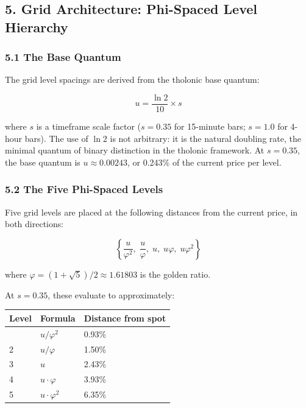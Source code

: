 \documentclass[
  11pt,
  letterpaper,
]{article}
\begin{document}
\subsection{5. Grid Architecture: Phi-Spaced Level
Hierarchy}\label{grid-architecture-phi-spaced-level-hierarchy}

\subsubsection{5.1 The Base Quantum}\label{the-base-quantum}

The grid level spacings are derived from the tholonic base quantum:

\[u = \frac{\ln 2}{10} \times s\]

where \(s\) is a timeframe scale factor (\(s = 0.35\) for 15-minute
bars; \(s = 1.0\) for 4-hour bars). The use of \(\ln 2\) is not
arbitrary: it is the natural doubling rate, the minimal quantum of
binary distinction in the tholonic framework. At \(s = 0.35\), the base
quantum is \(u \approx 0.00243\), or 0.243\% of the current price per
level.

\subsubsection{5.2 The Five Phi-Spaced
Levels}\label{the-five-phi-spaced-levels}

Five grid levels are placed at the following distances from the current
price, in both directions:

\[\left\{\frac{u}{\varphi^2},\; \frac{u}{\varphi},\; u,\; u\varphi,\; u\varphi^2\right\}\]

where \(\varphi = (1 + \sqrt{5})/2 \approx 1.61803\) is the golden
ratio.

At \(s = 0.35\), these evaluate to approximately:

\begin{longtable}[]{@{}lll@{}}
\toprule\noalign{}
Level & Formula & Distance from spot \\
\midrule\noalign{}
\endhead
\bottomrule\noalign{}
\endlastfoot
1 & \(u / \varphi^2\) & 0.93\% \\
2 & \(u / \varphi\) & 1.50\% \\
3 & \(u\) & 2.43\% \\
4 & \(u \cdot \varphi\) & 3.93\% \\
5 & \(u \cdot \varphi^2\) & 6.35\% \\
\end{longtable}
\end{document}
